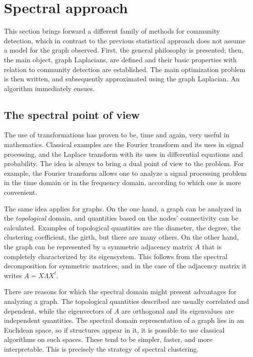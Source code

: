 \documentclass[../../main.tex]{subfiles} %
\begin{document}
\section{Spectral approach}  %
\label{sec:optimization-approach}
This section brings forward a different family of methods for community 
detection, which in contrast to the previous statistical approach does not 
assume a model for the graph observed. First, the general philosophy is 
presented; then, the main object, graph Laplacians, are defined and their basic 
properties with relation to community detection are established. The main 
optimization problem is then written, and subsequently approximated using the 
graph Laplacian. An algorithm immediately ensues.

\subsection{The spectral point of view}  %
The use of transformations has proven to be, time and again, very useful in 
mathematics. Classical examples are the Fourier transform and its uses in 
signal processing, and the Laplace transform with its uses in differential 
equations and probability. The idea is always to bring a dual point of view to 
the problem. For example, the Fourier transform allows one to analyze a signal 
processing problem in the time domain or in the frequency domain, according 
to which one is more convenient.

The same idea applies for graphs. On the one hand, a graph can be analyzed in 
the \textit{topological} domain, and quantities based on the nodes' connectivity 
can be calculated. Examples of topological quantities are the diameter, the 
degree, the clustering coefficient, the girth, but there are many others. 
On the other hand, the graph can be represented by a symmetric adjacency 
matrix \(A\) that is completely characterized by its eigensystem. This follows 
from the spectral decomposition for symmetric 
matrices, and in the case of the adjacency matrix it writes \(A = X 
\Lambda X^t\).

There are reasons for which the spectral domain might present advantages for 
analyzing a graph. The topological quantities described are usually correlated 
and dependent, while the eigenvectors of \(A\) are orthogonal and its 
eigenvalues are independent quantities. The spectral domain representation of 
a graph lies in an Euclidean space, so if structures appear in it, it is possible to 
use classical algorithms on such spaces. These tend to be simpler, faster, and 
more interpretable. This is precisely the strategy of spectral clustering.
\end{document}
